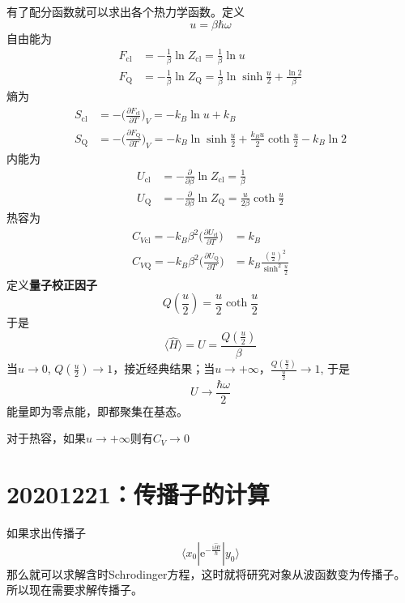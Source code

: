 \documentclass[12pt]{article}
\begin{document}
    有了配分函数就可以求出各个热力学函数。定义
    \[ u = \beta\hbar\omega \]
    自由能为
    \begin{align*}
        F_\mathrm{cl} &= -\frac 1{\beta} \ln{Z_\mathrm{cl}} = \frac 1{\beta} \ln{u}\\
        F_\mathrm{Q} &= -\frac 1{\beta} \ln{Z_\mathrm{Q}} = \frac 1{\beta}\ln{\sinh{\frac u2}}+ \frac {\ln{2}}{\beta}
    \end{align*}
    熵为
    \begin{align*}
        S_\mathrm{cl} &= -\bigg(\frac {\partial F_{\mathrm{cl}}}{\partial T}\bigg)_V = -k_B \ln{u} + k_B\\
        S_\mathrm{Q} &= -\bigg(\frac {\partial F_{\mathrm{Q}}}{\partial T}\bigg)_V = -k_B \ln{\sinh{\frac u2}} + \frac {k_Bu}2 \coth{\frac u2} - k_B \ln{2}
    \end{align*}
    内能为
    \begin{align*}
        U_\mathrm{cl} &= -\frac {\partial}{\partial \beta}\ln{Z_\mathrm{cl}} = \frac 1{\beta}\\
        U_\mathrm{Q} &= -\frac {\partial}{\partial \beta}\ln{Z_\mathrm{Q}} = \frac {u}{2\beta} \coth{\frac u2}
    \end{align*}
    热容为
    \begin{align*}
        C_{V\mathrm{cl}} = -k_B \beta^2 \bigg(\frac {\partial U_\mathrm{cl}}{\partial T}) &= k_B\\
        C_{V\mathrm{Q}} = -k_B \beta^2 \bigg(\frac {\partial U_\mathrm{Q}}{\partial T}) &= k_B \frac {(\frac u2)^2}{\sinh^2{\frac u2}}
    \end{align*}
    定义\textbf{量子校正因子}
    \[ Q(\frac u2) = \frac u2 \coth{\frac u2} \]
    于是 
    \[ \langle \hat{H} \rangle = U = \frac {Q(\frac u2)}{\beta} \]
    当$u \to 0$, $Q(\frac u2) \to 1$，接近经典结果；当$u \to +\infty$，$\frac {Q(\frac u2)}{\frac u2} \to 1$, 于是
    \[U \to \frac {\hbar \omega}2 \]
    能量即为零点能，即都聚集在基态。

    对于热容，如果$u \to +\infty$则有$C_V \to 0$

    \section{20201221：传播子的计算}

    如果求出传播子
    \begin{equation*}
        \langle x_0 | \mathrm{e}^{-\frac {\mathrm{i}\hat{H}t}{\hbar}} | y_0 \rangle
    \end{equation*}
    那么就可以求解含时Schrodinger方程，这时就将研究对象从波函数变为传播子。所以现在需要求解传播子。
\end{document}

